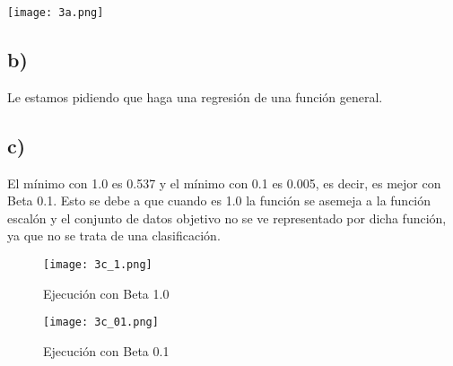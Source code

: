 \documentclass[12pt]{article}
\begin{document}
\texttt{[image: 3a.png]}

\subsection*{b)}
Le estamos pidiendo que haga una regresión de una función general.

\subsection*{c)}
El mínimo con 1.0 es 0.537 y el mínimo con 0.1 es 0.005, es decir, es mejor con Beta 0.1. Esto se debe a que cuando es 1.0 la función se asemeja a la función escalón y el conjunto de datos objetivo no se ve representado por dicha función, ya que no se trata de una clasificación.

\begin{figure}
\texttt{[image: 3c\_1.png]}
\caption{Ejecución con Beta 1.0}
\end{figure}

\begin{figure}
\texttt{[image: 3c\_01.png]}
\caption{Ejecución con Beta 0.1}
\end{figure}
\end{document}
